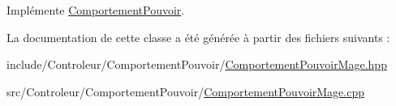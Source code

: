 \-Implémente \hyperlink{class_comportement_pouvoir_a8b8f4e753291ab73ab0016106f3948ff}{\-Comportement\-Pouvoir}.



\-La documentation de cette classe a été générée à partir des fichiers suivants \-:\begin{DoxyCompactItemize}
\item 
include/\-Controleur/\-Comportement\-Pouvoir/\hyperlink{_comportement_pouvoir_mage_8hpp}{\-Comportement\-Pouvoir\-Mage.\-hpp}\item 
src/\-Controleur/\-Comportement\-Pouvoir/\hyperlink{_comportement_pouvoir_mage_8cpp}{\-Comportement\-Pouvoir\-Mage.\-cpp}\end{DoxyCompactItemize}
